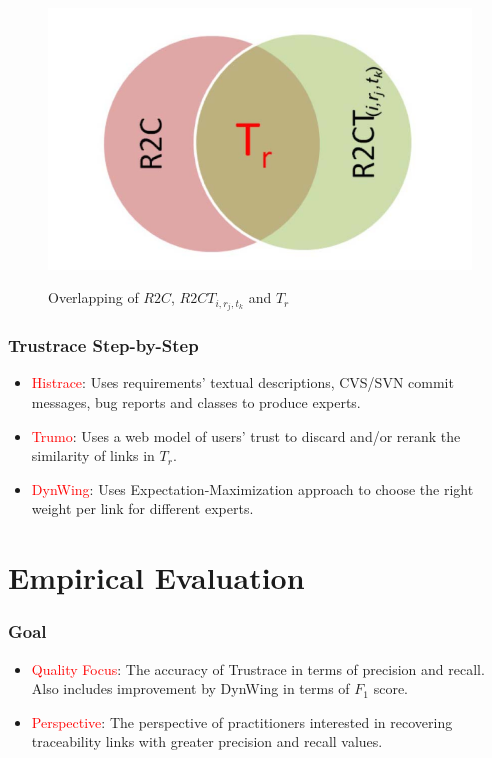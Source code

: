 \documentclass[12pt,hyperref=true,mathserif]{beamer}
\begin{document}
\begin{frame}
\begin{figure}
  \centering
  \includegraphics[scale=0.4]{Overlap}\\
  \caption{Overlapping of $R2C$, $R2CT_{i,r_{j},t_{k}}$ and $T_{r}$}\label{fig:Overlap}
\end{figure}
\end{frame}

\begin{frame}
\frametitle{Trustrace Step-by-Step}
\begin{itemize}
  \item \textcolor{red}{Histrace}: Uses requirements' textual descriptions, CVS/SVN commit messages, bug reports and classes to produce experts.\\[12pt]
  \item \textcolor{red}{Trumo}: Uses a web model of users' trust to discard and/or rerank the similarity of links in $T_{r}$.\\[12pt]
  \item \textcolor{red}{DynWing}: Uses Expectation-Maximization approach to choose the right weight per link for different experts.
\end{itemize}
\end{frame}

\section{Empirical Evaluation}
\begin{frame}
\frametitle{Goal}
\begin{itemize}
  \item \textcolor{red}{Quality Focus}:  The accuracy of  Trustrace in terms of precision and recall. Also includes improvement by DynWing in terms of $F_{1}$ score.\\[8pt]
  \item \textcolor{red}{Perspective}: The perspective of practitioners interested in recovering traceability links with greater precision and recall values.
\end{itemize}
\end{frame}
\end{document}
